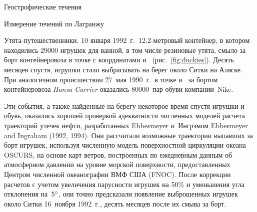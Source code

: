 \begin{chapter}{Геострофические течения}
\begin{section}{Измерение течений по Лагранжу}
\begin{paragraph}{Утята-путешественники.}
10 января 1992~г.\ 12.2-метровый контейнер, в котором находились 29000 
игрушек для ванной, в том числе резиновые утята, смыло за борт 
контейнеровоза в точке с координатами  и~
(рис.~\ref{fig:duckies}). Десять месяцев спустя, игрушки стало выбрасывать на
берег около Ситки на Аляске. При аналогичном происшествии 27~мая 1990~г.\ 
в точке  и~ за бортом контейнеровоза 
\textit{Hansa Carrier} оказались 80000~пар обуви компании~Nike. 
%

Эти события, а также найденные на берегу некоторое время спустя игрушки 
и обувь, оказались хорошей проверкой адекватности численных моделей расчета
траекторий утечек нефти, разработанных Ebbesmeyer и~Ингрэмом
Ebbesmeyer and Ingraham (1992, 1994). 
Они рассчитали возможные траектории выпавших за борт игрушек,
используя численную модель поверхностной циркуляции океана OSCURS,
на основе карт ветров, построенных по ежедневным данным об атмосферном
давлении на уровне морской поверхности, предоставленных Центром численной
океанографии ВМФ США (FNOC). После коррекции расчетов с учетом
увеличения парусности игрушек на 50\% и уменьшения угла отклонения
на~${5}^\circ$, они точно предсказали появление выброшенных 
игрушек
около Ситки 16~ноября 1992~г., десять месяцев после их смыва за
борт.
%
\end{paragraph}
\end{section}



\end{chapter}
